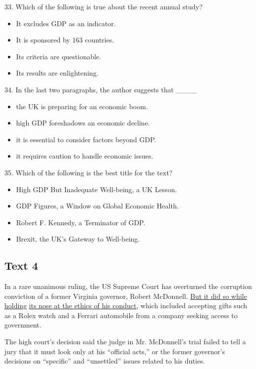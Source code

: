 \documentclass[UTF8,11pt]{ctexart}
\begin{document}
33. Which of the following is true about the recent annual study?


\begin{itemize}[leftmargin=2em,itemsep=.2em,topsep=.4em]\item[A.] It excludes GDP as an indicator.
\item[B.] It is sponsored by 163 countries.
\item[C.] Its criteria are questionable.
\item[D.] Its results are enlightening.
\end{itemize}

34. In the last two paragraphs, the author suggests that \_\_\_\_


\begin{itemize}[leftmargin=2em,itemsep=.2em,topsep=.4em]\item[A.] the UK is preparing for an economic boom.
\item[B.] high GDP foreshadows an economic decline.
\item[C.] it is essential to consider factors beyond GDP.
\item[D.] it requires caution to handle economic issues.
\end{itemize}

35. Which of the following is the best title for the text?


\begin{itemize}[leftmargin=2em,itemsep=.2em,topsep=.4em]\item[A.] High GDP But Inadequate Well-being, a UK Lesson.
\item[B.] GDP Figures, a Window on Global Economic Health.
\item[C.] Robert F. Kennedy, a Terminator of GDP.
\item[D.] Brexit, the UK’s Gateway to Well-being.
\end{itemize}

\subsection*{\textbf{Text 4}}


In a rare unanimous ruling, the US Supreme Court has overturned the corruption conviction of a former Virginia governor, Robert McDonnell. \uline{But it did so while holding} \uline{its nose at the ethics of his conduct}, which included accepting gifts such as a Rolex watch and a Ferrari automobile from a company seeking access to government.


The high court’s decision said the judge in Mr. McDonnell’s trial failed to tell a jury that it must look only at his “official acts,” or the former governor’s decisions on “specific” and “unsettled” issues related to his duties.
\end{document}
